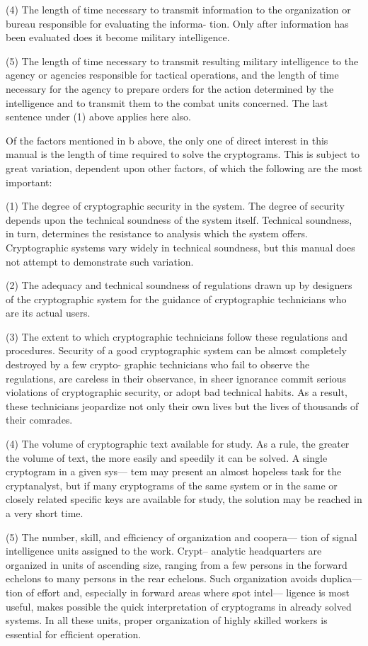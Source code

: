 (4) The length of time necessary to transmit information to the
organization or bureau responsible for evaluating the informa-
tion. Only after information has been evaluated does it become
military intelligence.

(5) The length of time necessary to transmit resulting military
intelligence to the agency or agencies responsible for tactical
operations, and the length of time necessary for the agency to
prepare orders for the action determined by the intelligence and
to transmit them to the combat units concerned. The last
sentence under (1) above applies here also.

\mypara Of the factors mentioned in b above, the only one of direct interest
in this manual is the length of time required to solve the cryptograms.
This is subject to great variation, dependent upon other factors, of
which the following are the most important:

(1) The degree of cryptographic security in the system. The degree
of security depends upon the technical soundness of the system
itself. Technical soundness, in turn, determines the resistance
to analysis which the system offers. Cryptographic systems vary
widely in technical soundness, but this manual does not attempt
to demonstrate such variation.
 
(2) The adequacy and technical soundness of regulations drawn up
by designers of the cryptographic system for the guidance of
cryptographic technicians who are its actual users.

(3) The extent to which cryptographic technicians follow these
regulations and procedures. Security of a good cryptographic
system can be almost completely destroyed by a few crypto-
graphic technicians who fail to observe the regulations, are
careless in their observance, in sheer ignorance commit serious
violations of cryptographic security, or adopt bad technical
habits. As a result, these technicians jeopardize not only their
own lives but the lives of thousands of their comrades.

(4) The volume of cryptographic text available for study. As a
rule, the greater the volume of text, the more easily and
speedily it can be solved. A single cryptogram in a given sys—
tem may present an almost hopeless task for the cryptanalyst,
but if many cryptograms of the same system or in the same or
closely related speciﬁc keys are available for study, the solution
may be reached in a very short time.

(5) The number, skill, and efﬁciency of organization and coopera—
tion of signal intelligence units assigned to the work. Crypt--
analytic headquarters are organized in units of ascending size,
ranging from a few persons in the forward echelons to many
persons in the rear echelons. Such organization avoids duplica—
tion of effort and, especially in forward areas where spot intel—
ligence is most useful, makes possible the quick interpretation
of cryptograms in already solved systems. In all these units,
proper organization of highly skilled workers is essential for
efﬁcient operation.

